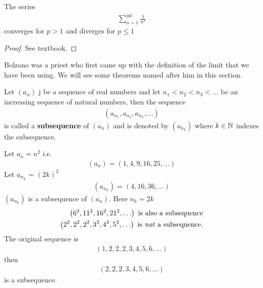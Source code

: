 \begin{theorem}
	The series
	\begin{align}
		\sum_{n=1}^{\inf } \frac{1}{n^{2}}
	\end{align}
	converges for $p > 1$ and diverges for $p \le 1$
\end{theorem}

\begin{proof}
	See textbook.
\end{proof}

Bolzano was a priest who first came up with the definition of the limit that we have been using. We will see some theorems named after him in this section.

\begin{definition}
	Let $\left( a_n \right) $ j be a sequence of real numbers and let $n_1 < n_2 < n_3 < \ldots$ be an increasing sequence of natural numbers, then the sequence 
	\begin{align}
	\left( a_{n_{1}}, a_{n_{2}}, a_{n_{3}}, \ldots \right) 
	\end{align}
	is called a \textbf{subsequence} of $\left( a_n \right)$  and is denoted by $\left( a_{n_{k}} \right) $ where $k \in \mathbb{N}$ indexes the subsequence.

\end{definition}

\begin{eg}
	Let $a_n = n^{2}$ i.e. 
	\begin{align}
		\left( a_n \right) = \left( 1, 4, 9, 16, 25, \ldots \right) 
	\end{align}
	Let $a_{n_{k}}$ = $\left( 2k \right)^{2} $ 
	\begin{align}
		\left( a_{n_{k}} \right) = \left( 4, 16, 36, \ldots \right) 
	\end{align}
	$\left( a_{n_{k}} \right) $ is a subsequence of $\left( a_n \right) $. Here $n_{k} = 2k$
	\begin{align}
		\left( 6^{2}, 11^{2}, 16^{2}, 21^{2}, \ldots \right) \text{ is also a subsequence} \\
		\left( 2^{2}, 2^{2}, 2^{2}, 3^{2}, 4^{2}, 5^{2}, \ldots \right) \text{ is \textit{not} a subsequence.}
	\end{align}
	The original sequence is 
	\begin{align}
		\left( 1, 2, 2, 2, 3, 4, 5, 6, \ldots \right) 
	\end{align}
	then 
	\begin{align}
		\left( 2, 2, 2, 3, 4, 5, 6, \ldots \right) 
	\end{align}
	is a subsequence.

\end{eg}

